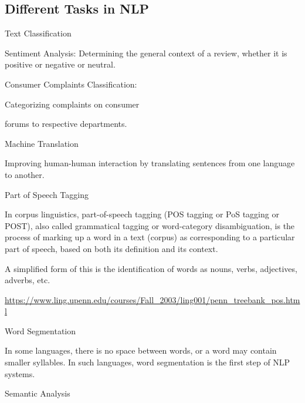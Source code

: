 	\subsection{Different Tasks in NLP}
	\begin{bulletedlist}
		\item Text Classification
		\begin{bulletedlist}
			\item Sentiment Analysis: Determining the general context of a review, whether it is positive or negative or neutral.
			\item Consumer Complaints Classification:
			\begin{bulletedlist}
				\item Categorizing complaints on consumer
				\item forums to respective departments.
			\end{bulletedlist}
		\end{bulletedlist}
		\item Machine Translation
		\begin{bulletedlist}
			\item Improving human-human interaction by translating sentences from one language to another.
		\end{bulletedlist}
		\item Part of Speech Tagging
		\begin{bulletedlist}
			\item In corpus linguistics, part-of-speech tagging (POS tagging or PoS tagging or POST), also called grammatical tagging or word-category disambiguation, is the process of marking up a word in a text (corpus) as corresponding to a particular part of speech, based on both its definition and its context.
			\item A simplified form of this is the identification of words as nouns, verbs, adjectives, adverbs, etc.
			\item \href{Tag-set}{https://www.ling.upenn.edu/courses/Fall\_2003/ling001/penn\_treebank\_pos.html}
		\end{bulletedlist}
		\item Word Segmentation
		\begin{bulletedlist}
			\item In some languages, there is no space between words, or a word may contain smaller syllables. In such languages, word segmentation is the first step of NLP systems.
		\end{bulletedlist}
		\item Semantic Analysis

\end{bulletedlist}
